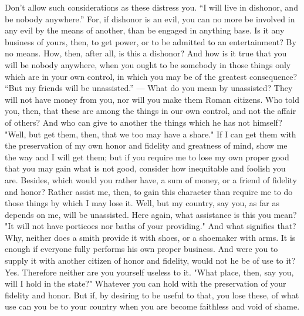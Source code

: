 Don't  allow such  considerations  as  these distress  you.  ``I  will live  in
dishonor, and  be nobody anywhere.''  For, if dishonor is  an evil, you  can no
more  be involved  in any  evil by  the means  of another,  than be  engaged in
anything  base. Is  it any  business of  yours, then,  to get  power, or  to be
admitted to  an entertainment?  By no means.  How, then, after  all, is  this a
dishonor? And how is  it true that you will be nobody  anywhere, when you ought
to be somebody in those things only which are in your own control, in which you
may be of the greatest consequence?  ``But my friends will be unassisted.'' ---
What do you mean by unassisted? They will not have money from you, nor will you
make them Roman citizens.  Who told you, then, that these  are among the things
in our own control,  and not the affair of others? And who  can give to another
the things which he has not himself? "Well, but get them, then, that we too may
have a  share." If I  can get them  with the preservation  of my own  honor and
fidelity and greatness of mind, show me the way and I will get them; but if you
require me  to lose  my own proper  good that  you may gain  what is  not good,
consider how inequitable  and foolish you are. Besides, which  would you rather
have, a  sum of money,  or a  friend of fidelity  and honor? Rather  assist me,
then, to gain this character than require me  to do those things by which I may
lose it.  Well, but  my country,  say you,  as far  as depends  on me,  will be
unassisted. Here  again, what assistance  is this you  mean? "It will  not have
porticoes nor baths  of your providing." And what signifies  that? Why, neither
does a smith provide  it with shoes, or a shoemaker with arms.  It is enough if
everyone fully performs his own proper business. And were you to supply it with
another citizen  of honor  and fidelity,  would not he  be of  use to  it? Yes.
Therefore neither are  you yourself useless to it. "What  place, then, say you,
will I hold in the state?" Whatever  you can hold with the preservation of your
fidelity and honor. But  if, by desiring to be useful to  that, you lose these,
of what use can  you be to your country when you are  become faithless and void
of shame.
